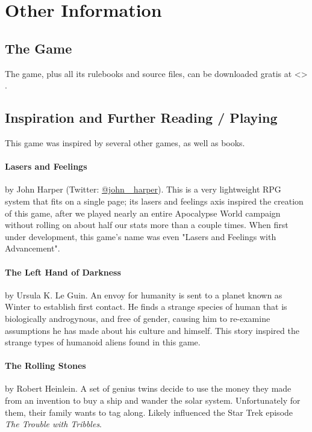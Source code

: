 \section{Other Information}

\subsection{The Game}

\par
The game, plus all its rulebooks and source files, can be downloaded gratis at <\website> .

\subsection{Inspiration and Further Reading / Playing}
\par
This game was inspired by several other games, as well as books.

\paragraph{Lasers and Feelings}
by John Harper (Twitter: \href{https://twitter.com/john_harper/}{@john\_ harper}). This is a very lightweight RPG system that fits on a single page; its lasers and feelings axis inspired the creation of this game, after we played nearly an entire Apocalypse World campaign without rolling on about half our stats more than a couple times. When first under development, this game's name was even "Lasers and Feelings with Advancement".

\paragraph{The Left Hand of Darkness}
by Ursula K. Le Guin. An envoy for humanity is sent to a planet known as Winter to establish first contact. He finds a strange species of human that is biologically androgynous, and free of gender, causing him to re-examine assumptions he has made about his culture and himself. This story inspired the strange types of humanoid aliens found in this game.

\paragraph{The Rolling Stones}
by Robert Heinlein. A set of genius twins decide to use the money they made from an invention to buy a ship and wander the solar system. Unfortunately for them, their family wants to tag along. Likely influenced the Star Trek episode \textit{The Trouble with Tribbles}.

